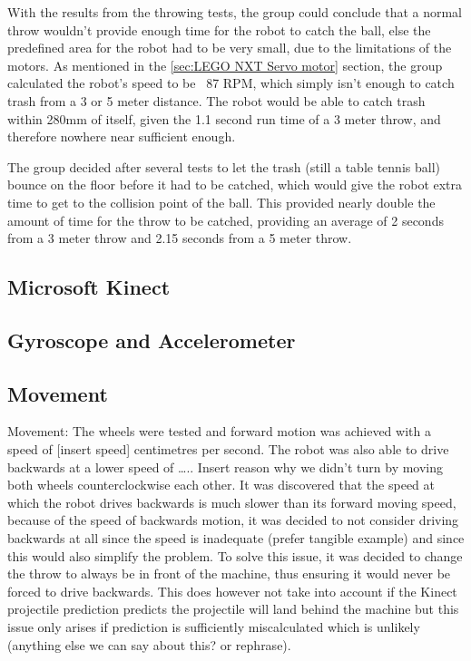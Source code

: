 With the results from the throwing tests, the group could conclude that a normal throw wouldn't provide enough time for the robot to catch the ball, else the predefined area for the robot had to be very small, due to the limitations of the motors. As mentioned in the \ref{sec:LEGO NXT Servo motor} section, the group calculated the robot's speed to be ~87 RPM, which simply isn't enough to catch trash from a 3 or 5 meter distance. The robot would be able to catch trash within 280mm of itself, given the 1.1 second run time of a 3 meter throw, and therefore nowhere near sufficient enough. 

The group decided after several tests to let the trash (still a table tennis ball) bounce on the floor before it had to be catched, which would give the robot extra time to get to the collision point of the ball. This provided nearly double the amount of time for the throw to be catched, providing an average of 2 seconds from a 3 meter throw and 2.15 seconds from a 5 meter throw.

\subsection{Microsoft Kinect}
\label{sec:i1Microsoft KinectImplementation}

\subsection{Gyroscope and Accelerometer}
\label{sec:i1Gyroscope and AccelerometerImplementation}

\subsection{Movement}
\label{sec:i1MovementImplementation}
Movement: The wheels were tested and forward motion was achieved with a speed of [insert speed] centimetres per second. The robot was also able to drive backwards at a lower speed of ….. Insert reason why we didn't turn by moving both wheels counterclockwise each other. It was discovered that the speed at which the robot drives backwards is much slower than its forward moving speed, because of the speed of backwards motion, it was decided to not consider driving backwards at all since the speed is inadequate (prefer tangible example) and since this would also simplify the problem. To solve this issue, it was decided to change the throw to always be in front of the machine, thus ensuring it would never be forced to drive backwards. This does however not take into account if the Kinect projectile prediction predicts the projectile will land behind the machine but this issue only arises if prediction is sufficiently miscalculated which is unlikely (anything else we can say about this? or rephrase).

